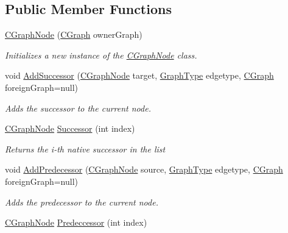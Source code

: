 \subsection*{Public Member Functions}
\begin{DoxyCompactItemize}
\item 
\hyperlink{class_graph_library_1_1_c_graph_node_aa1d9c216b6466f4bd34b6a6d761a5a83}{C\+Graph\+Node} (\hyperlink{class_graph_library_1_1_c_graph}{C\+Graph} owner\+Graph)
\begin{DoxyCompactList}\small\item\em Initializes a new instance of the \hyperlink{class_graph_library_1_1_c_graph_node}{C\+Graph\+Node} class. \end{DoxyCompactList}\item 
void \hyperlink{class_graph_library_1_1_c_graph_node_ad710e8d3562812517fd4558518442990}{Add\+Successor} (\hyperlink{class_graph_library_1_1_c_graph_node}{C\+Graph\+Node} target, \hyperlink{namespace_graph_library_1_1_generics_a1bac729ea88e6f3925406df33f15d056}{Graph\+Type} edgetype, \hyperlink{class_graph_library_1_1_c_graph}{C\+Graph} foreign\+Graph=null)
\begin{DoxyCompactList}\small\item\em Adds the successor to the current node. \end{DoxyCompactList}\item 
\hyperlink{class_graph_library_1_1_c_graph_node}{C\+Graph\+Node} \hyperlink{class_graph_library_1_1_c_graph_node_a8264470518ce61df1bc111cdafafba68}{Successor} (int index)
\begin{DoxyCompactList}\small\item\em Returns the i-\/th native successor in the list \end{DoxyCompactList}\item 
void \hyperlink{class_graph_library_1_1_c_graph_node_a5d03becd7eb30cecb2074d4d7c9e818c}{Add\+Predecessor} (\hyperlink{class_graph_library_1_1_c_graph_node}{C\+Graph\+Node} source, \hyperlink{namespace_graph_library_1_1_generics_a1bac729ea88e6f3925406df33f15d056}{Graph\+Type} edgetype, \hyperlink{class_graph_library_1_1_c_graph}{C\+Graph} foreign\+Graph=null)
\begin{DoxyCompactList}\small\item\em Adds the predecessor to the current node. \end{DoxyCompactList}\item 
\hyperlink{class_graph_library_1_1_c_graph_node}{C\+Graph\+Node} \hyperlink{class_graph_library_1_1_c_graph_node_ab37e7c5b8dc940a2cfd8e301f50d633e}{Predeccessor} (int index)

\end{DoxyCompactItemize}
